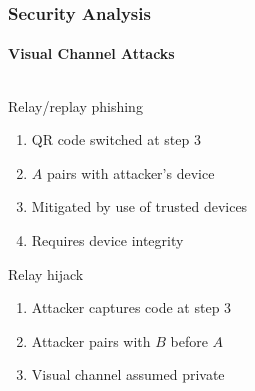\documentclass[handout, notes=hide]{beamer}
\begin{document}

\begin{frame}
\frametitle{Security Analysis}
\framesubtitle{Visual Channel Attacks}

\begin{columns}[T]
\begin{column}[T]{0.6\textwidth}
\setlength{\parskip}{0.5em}

Relay/replay phishing
\begin{enumerate}
\item QR code switched at step 3
\item $A$ pairs with attacker's device
\item Mitigated by use of trusted devices
\item Requires device integrity
\end{enumerate}

Relay hijack
\begin{enumerate}
\item Attacker captures code at step 3
\item Attacker pairs with $B$ before $A$
\item Visual channel assumed private
\end{enumerate}


\end{column}
\end{columns}
\end{frame}
\end{document}

